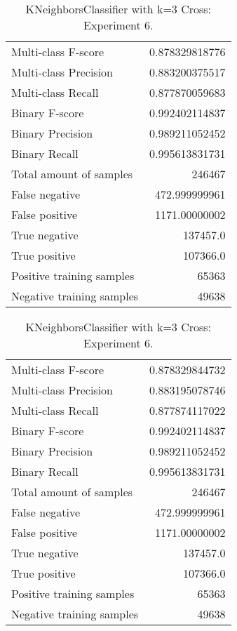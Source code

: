 \begin{table}[H]
\begin{minipage}{0.5\textwidth}
\caption{KNeighborsClassifier with k=3 Cross: Experiment 5.}
\centering
\begin{tabular}{l r}
\toprule
Multi-class F-score & 0.878329818776 \\
Multi-class Precision & 0.883200375517 \\
Multi-class Recall & 0.877870059683 \\
\midrule
Binary F-score & 0.992402114837 \\
Binary Precision & 0.989211052452 \\
Binary Recall & 0.995613831731 \\
\midrule
Total amount of samples & 246467 \\
False negative & 472.999999961 \\
False positive & 1171.00000002 \\
True negative & 137457.0 \\
True positive & 107366.0 \\
\midrule
Positive training samples & 65363 \\
Negative training samples & 49638 \\
\bottomrule
\end{tabular}
\end{minipage}
\hfillx
\begin{minipage}{0.5\textwidth}
\caption{KNeighborsClassifier with k=3 Cross: Experiment 6.}
\centering
\begin{tabular}{l r}
\toprule
Multi-class F-score & 0.878329844732 \\
Multi-class Precision & 0.883195078746 \\
Multi-class Recall & 0.877874117022 \\
\midrule
Binary F-score & 0.992402114837 \\
Binary Precision & 0.989211052452 \\
Binary Recall & 0.995613831731 \\
\midrule
Total amount of samples & 246467 \\
False negative & 472.999999961 \\
False positive & 1171.00000002 \\
True negative & 137457.0 \\
True positive & 107366.0 \\
\midrule
Positive training samples & 65363 \\
Negative training samples & 49638 \\
\bottomrule
\end{tabular}
\end{minipage}
\end{table}
